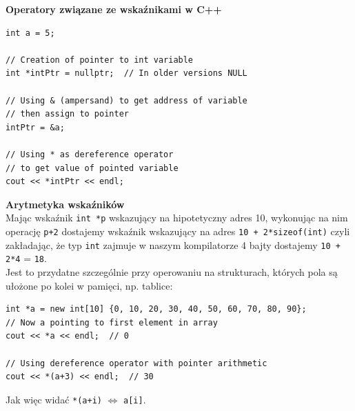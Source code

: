 \documentclass[12pt]{article}
\begin{document}
    \begin{definition}
    	\textbf{Operatory związane ze wskaźnikami w C++}
    	\begin{verbatim}
int a = 5;

// Creation of pointer to int variable
int *intPtr = nullptr;  // In older versions NULL

// Using & (ampersand) to get address of variable
// then assign to pointer
intPtr = &a;

// Using * as dereference operator
// to get value of pointed variable
cout << *intPtr << endl;
    	\end{verbatim}
    \end{definition}
    
    \begin{definition}
    	\textbf{Arytmetyka wskaźników} \\
    	Mając wskaźnik \texttt{int *p} wskazujący na hipotetyczny adres 10, wykonując na nim operację \texttt{p+2} dostajemy wskaźnik wskazujący na adres \texttt{10 + 2*sizeof(int)}
    	czyli zakładając, że typ \texttt{int} zajmuje w naszym kompilatorze 4 bajty dostajemy \texttt{10 + 2*4} = \texttt{18}. \\
    	Jest to przydatne szczególnie przy operowaniu na strukturach, których pola są ułożone po kolei w pamięci, np. tablice:
    	\begin{verbatim}
int *a = new int[10] {0, 10, 20, 30, 40, 50, 60, 70, 80, 90};
// Now a pointing to first element in array
cout << *a << endl;  // 0

// Using dereference operator with pointer arithmetic
cout << *(a+3) << endl;  // 30
    	\end{verbatim}
    	Jak więc widać \texttt{*(a+i)} $\Leftrightarrow$ \texttt{a[i]}.
    \end{definition}
    
\end{document}
